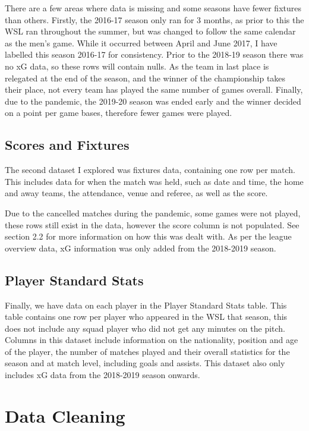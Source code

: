 \documentclass[12pt, a4paper, twocolumn]{article}
\begin{document}
There are a few areas where data is missing and some seasons have fewer fixtures than others. Firstly, the 2016-17 season only ran for 3 months, as prior to this the WSL ran throughout the summer, but was changed to follow the same calendar as the men's game. While it occurred between April and June 2017, I have labelled this season 2016-17 for consistency. Prior to the 2018-19 season there was no xG data, so these rows will contain nulls. As the team in last place is relegated at the end of the season, and the winner of the championship takes their place, not every team has played the same number of games overall. Finally, due to the pandemic, the 2019-20 season was ended early and the winner decided on a point per game bases, therefore fewer games were played.

\subsection{Scores and Fixtures}

The second dataset I explored was fixtures data\cite{fixtures}, containing one row per match. This includes data for when the match was held, such as date and time, the home and away teams, the attendance, venue and referee, as well as the score.

Due to the cancelled matches during the pandemic, some games were not played, these rows still exist in the data, however the score column is not populated. See section 2.2 for more information on how this was dealt with. As per the league overview data, xG information was only added from the 2018-2019 season.

\subsection{Player Standard Stats}

Finally, we have data on each player in the Player Standard Stats table\cite{players}. This table contains one row per player who appeared in the WSL that season, this does not include any squad player who did not get any minutes on the pitch. Columns in this dataset include information on the nationality, position and age of the player, the number of matches played and their overall statistics for the season and at match level, including goals and assists. This dataset also only includes xG data from the 2018-2019 season onwards.

\section{Data Cleaning}
\end{document}
